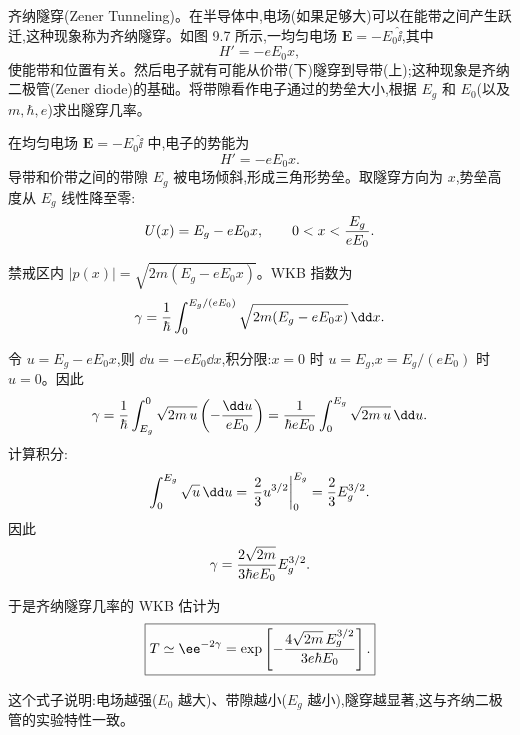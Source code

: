 \begin{question}
齐纳隧穿(Zener Tunneling)。在半导体中,电场(如果足够大)可以在能带之间产生跃迁,这种现象称为齐纳隧穿。如图 9.7 所示,一均匀电场 $\mathbf E=-E_0\hat{\mathbf \ii}$,其中
\[
H'=-eE_0x,
\]
使能带和位置有关。然后电子就有可能从价带(下)隧穿到导带(上);这种现象是齐纳二极管(Zener diode)的基础。将带隙看作电子通过的势垒大小,根据 $E_g$ 和 $E_0$(以及 $m,\hbar,e$)求出隧穿几率。
\end{question}
\begin{solution}
在均匀电场 $\mathbf E=-E_0\hat{\mathbf \ii}$ 中,电子的势能为
\[
H'=-eE_0x.
\]
导带和价带之间的带隙 $E_g$ 被电场倾斜,形成三角形势垒。取隧穿方向为 $x$,势垒高度从 $E_g$ 线性降至零:
\[
U(x)=E_g-eE_0x,
\qquad 0<x<{E_g\over eE_0}.
\]

禁戒区内 $|p(x)|=\sqrt{2m(E_g-eE_0x)}$。WKB 指数为
\[
\gamma={1\over\hbar}\int_0^{E_g/(eE_0)}
\sqrt{2m(E_g-eE_0x)}\,\dd x.
\]

令 $u=E_g-eE_0x$,则 $\dd u=-eE_0\dd x$,积分限:$x=0$ 时 $u=E_g$,$x=E_g/(eE_0)$ 时 $u=0$。因此
\[
\gamma={1\over\hbar}\int_{E_g}^{0}\sqrt{2m\,u}\left(-{\dd u\over eE_0}\right)
={1\over\hbar eE_0}\int_0^{E_g}\sqrt{2m\,u}\,\dd u.
\]
计算积分:
\[
\int_0^{E_g}\sqrt{u}\,\dd u
=\left.{2\over3}u^{3/2}\right|_0^{E_g}={2\over3}E_g^{3/2}.
\]
因此
\[
\gamma={2\sqrt{2m}\over3\hbar eE_0}E_g^{3/2}.
\]

于是齐纳隧穿几率的 WKB 估计为
\[
\boxed{T\simeq \ee^{-2\gamma}
=\exp\left[-{4\sqrt{2m}\,E_g^{3/2}\over3e\hbar E_0}\right].}
\]

这个式子说明:电场越强($E_0$ 越大)、带隙越小($E_g$ 越小),隧穿越显著,这与齐纳二极管的实验特性一致。
\end{solution}

